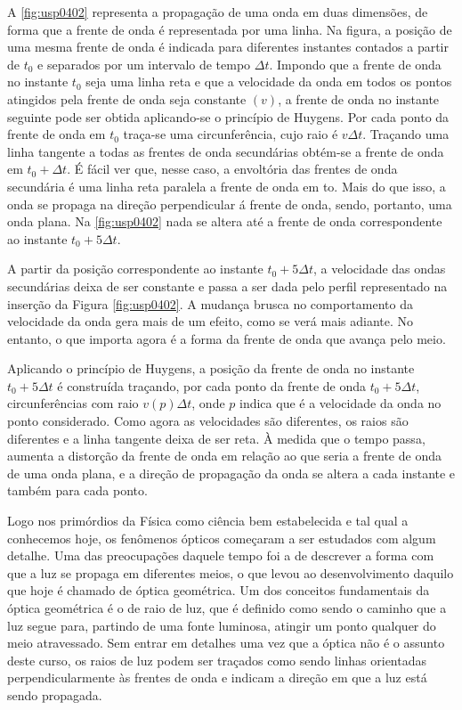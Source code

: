 \documentclass[]{book}
\theoremstyle{definition}
\theoremstyle{definition}
\theoremstyle{definition}
\theoremstyle{remark}
\begin{document}
A \ref{fig:usp0402} representa a propagação de uma onda em duas dimensões, de forma que a frente de onda é representada por uma linha. Na figura, a posição de uma mesma frente de onda é indicada para diferentes instantes contados a partir de \(t_0\) e separados por um intervalo de tempo \(\Delta t\). Impondo que a frente de onda no instante \(t_0\) seja uma linha reta e que a velocidade da onda em todos os pontos atingidos pela frente de onda seja constante \((v)\), a frente de onda no instante seguinte pode ser obtida aplicando-se o princípio de Huygens. Por cada ponto da frente de onda em \(t_0\) traça-se uma circunferência, cujo raio é \(v\Delta t\). Traçando uma linha tangente a todas as frentes de onda secundárias obtém-se a frente de onda em \(t_0 +\Delta t\). É fácil ver que, nesse caso, a envoltória das frentes de onda secundária é uma linha reta paralela a frente de onda em to. Mais do que isso, a onda se propaga na direção perpendicular á frente de onda, sendo, portanto, uma onda plana. Na \ref{fig:usp0402} nada se altera até a frente de onda correspondente ao instante \(t_0 +5\Delta t\).

A partir da posição correspondente ao instante \(t_0 +5\Delta t\), a velocidade das ondas secundárias deixa de ser constante e passa a ser dada pelo perfil representado na inserção da Figura \ref{fig:usp0402}. A mudança brusca no comportamento da velocidade da onda gera mais de um efeito, como se verá mais adiante. No entanto, o que importa agora é a forma da frente de onda que avança pelo meio.

Aplicando o princípio de Huygens, a posição da frente de onda no instante \(t_0 +5\Delta t\) é construída traçando, por cada ponto da frente de onda \(t_0 +5\Delta t\), circunferências com raio \(v(p)\Delta t\), onde \(p\) indica que é a velocidade da onda no ponto considerado. Como agora as velocidades são diferentes, os raios são diferentes e a linha tangente deixa de ser reta. À medida que o tempo passa, aumenta a distorção da frente de onda em relação ao que seria a frente de onda de uma onda plana, e a direção de propagação da onda se altera a cada instante e também para cada ponto.

Logo nos primórdios da Física como ciência bem estabelecida e tal qual a conhecemos hoje, os fenômenos ópticos começaram a ser estudados com algum detalhe. Uma das preocupações daquele tempo foi a de descrever a forma com que a luz se propaga em diferentes meios, o que levou ao desenvolvimento daquilo que hoje é chamado de óptica geométrica. Um dos conceitos fundamentais da óptica geométrica é o de raio de luz, que é definido como sendo o caminho que a luz segue para, partindo de uma fonte luminosa, atingir um ponto qualquer do meio atravessado. Sem entrar em detalhes uma vez que a óptica não é o assunto deste curso, os raios de luz podem ser traçados como sendo linhas orientadas perpendicularmente às frentes de onda e indicam a direção em que a luz está sendo propagada.
\end{document}
